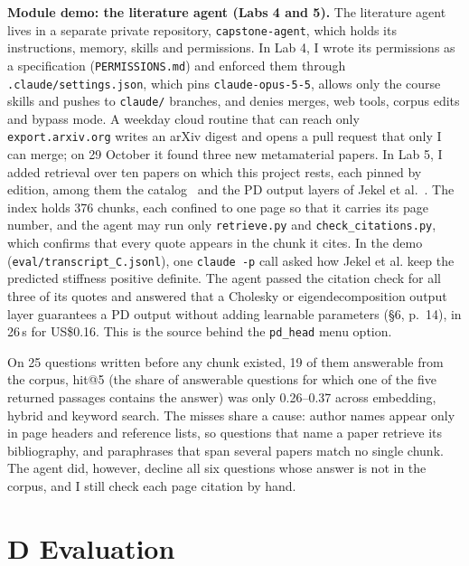 \documentclass[11pt]{article}
\begin{document}
\textbf{Module demo: the literature agent (Labs 4 and 5).} The literature agent lives in a separate
private repository, \texttt{capstone-agent}, which holds its instructions, memory, skills and
permissions. In Lab 4, I wrote its permissions as a specification
(\texttt{PERMISSIONS.md}) and enforced them through \texttt{.claude/settings.json}, which pins
\texttt{claude-opus-5-5}, allows only the course skills and pushes to \texttt{claude/} branches,
and denies merges, web tools, corpus edits and bypass mode. A weekday cloud routine that can reach
only \texttt{export.arxiv.org} writes an arXiv digest and opens a pull request that only I can
merge; on 29 October it found three new metamaterial papers. In Lab 5, I added retrieval over ten
papers on which this project rests, each pinned by edition, among them the catalog~\cite{lumpe} and
the PD output layers of Jekel et al.~\cite{jekel}. The index holds 376 chunks, each confined to one
page so that it carries its page number, and the agent may run only \texttt{retrieve.py} and
\texttt{check\_citations.py}, which confirms that every quote appears in the chunk it cites. In the
demo (\texttt{eval/transcript\_C.jsonl}), one \texttt{claude -p} call asked how Jekel et al. keep
the predicted stiffness positive definite. The agent passed the citation check for all three of
its quotes and answered that a Cholesky or
eigendecomposition output layer guarantees a PD output without adding learnable parameters
(\S6, p.~14), in 26\,s for US\$0.16. This is the source behind the \texttt{pd\_head} menu option.

On 25 questions written before any chunk existed, 19 of them answerable from the corpus, hit@5
(the share of answerable questions for which one of the five returned passages contains the
answer) was only 0.26--0.37 across embedding, hybrid and keyword search. The misses
share a cause: author names appear only in page headers and reference lists, so questions that name
a paper retrieve its bibliography, and paraphrases that span several papers match no single chunk.
The agent did, however, decline all six questions whose answer is not in the corpus, and I still
check each page citation by hand.

\section*{D \quad Evaluation}
\end{document}
